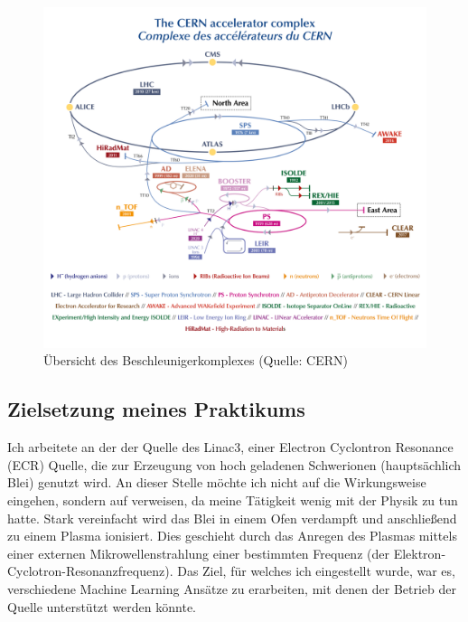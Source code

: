\documentclass[11pt, a4paper, titlepage, headings=standardclasses]{scrartcl}
\begin{document}
\begin{figure}
    \centering
    \includegraphics{cern_acc_complex.png}
    \caption{Übersicht des Beschleunigerkomplexes (Quelle: CERN)}
    \label{fig:cern_acc_complex}
\end{figure}

\subsection*{Zielsetzung meines Praktikums}

Ich arbeitete an der der Quelle des Linac3, einer Electron Cyclontron Resonance (ECR) Quelle, die zur Erzeugung von hoch geladenen Schwerionen (hauptsächlich Blei) genutzt wird. An dieser Stelle möchte ich nicht auf die Wirkungsweise eingehen, sondern auf \cite{Brown:IonSources} verweisen, da meine Tätigkeit wenig mit der Physik zu tun hatte. Stark vereinfacht wird das Blei in einem Ofen verdampft und anschließend zu einem Plasma ionisiert. Dies geschieht durch das Anregen des Plasmas mittels einer externen Mikrowellenstrahlung einer bestimmten Frequenz (der Elektron-Cyclotron-Resonanzfrequenz). Das Ziel, für welches ich eingestellt wurde, war es, verschiedene Machine Learning Ansätze zu erarbeiten, mit denen der Betrieb der Quelle unterstützt werden könnte.
\end{document}
